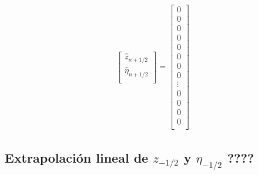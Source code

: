 \documentclass[]{article}%
\newcommand{\hz}{\hat{z}}
\newcommand{\heta}{\hat{\eta}}
\begin{document}
\begin{equation}
\begin{split}
\begin{bmatrix}
\hz_{n+1/2} \\ \heta_{n+1/2} \\
\end{bmatrix}
= 
\begin{bmatrix}
0 \\ 0 \\0 \\0\\0 \\0\\0\\0\\
\vdots \\ 
0 \\0\\0\\0\\
\end{bmatrix}
\end{split}
\end{equation}
\subsection*{Extrapolación lineal de $z_{-1/2}$ y $\eta_{-1/2}$ ????}
\end{document}

